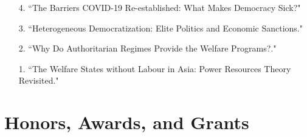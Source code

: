\documentclass[margin,line]{res}
\begin{document}
\begin{resume}
\begin{enumerate}[leftmargin=*]
	\item[4.] ``The Barriers COVID-19 Re-established: What Makes Democracy Sick?"
	\item[3.] ``Heterogeneous Democratization: 	Elite Politics and Economic Sanctions."
	\item[2.] ``Why Do Authoritarian Regimes Provide the Welfare Programs?."
	\item[1.] ``The Welfare States without Labour in Asia: Power Resources Theory Revisited."
\end{enumerate}

\section{\sc Honors, Awards, and Grants} 


\end{resume}
\end{document}
